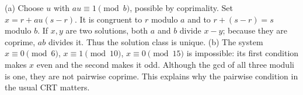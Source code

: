 (a) Choose $u$ with $au\equiv1\pmod b$, possible by coprimality. Set $x=r+au(s-r)$. It is congruent to $r$ modulo $a$ and to $r+(s-r)=s$ modulo $b$. If $x,y$ are two solutions, both $a$ and $b$ divide $x-y$; because they are coprime, $ab$ divides it. Thus the solution class is unique.
(b) The system $x\equiv0\pmod6$, $x\equiv1\pmod{10}$, $x\equiv0\pmod{15}$ is impossible: its first condition makes $x$ even and the second makes it odd. Although the gcd of all three moduli is one, they are not pairwise coprime. This explains why the pairwise condition in the usual CRT matters.

